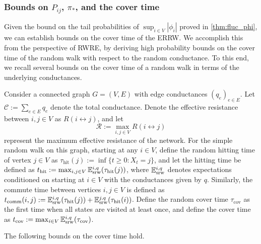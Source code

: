 \documentclass[a4paper, 11pt]{article}
\newcommand{\E}{\mathbb{E}}
\newcommand{\Esrw}{\E_{\textnormal{srw}}}
\begin{document}
\subsubsection{Bounds on $P_{ij}$, $\pi_*$, and the cover time}

Given the bound on the tail probabilities of $\sup_{i\in V}|\phi_i|$ proved in \cref{thm:fluc_phi}, we can establish bounds on the cover time of the ERRW. We accomplish this from the perspective of RWRE, by deriving high probability bounds on the cover time of the random walk with respect to the random conductance. To this end, we recall several bounds on the cover time of a random walk 
in terms of the underlying conductances.

Consider a connected graph \( G = (V, E) \) with edge conductances \( (q_e)_{e \in E} \). Let \( \mathcal{C} := \sum_{e \in E} q_e \) denote the total conductance. Denote the effective resistance between \( i, j \in V \) as \( R(i \leftrightarrow j) \), and let 
\[
\mathcal{R} := \max_{i,j \in V} R(i \leftrightarrow j)
\]
represent the maximum effective resistance of the network. For the simple random walk on this graph, starting at any $i \in V$, define the random hitting time of vertex \( j \in V \) as $\tau_{\text{hit}}(j) := \inf \{ t \geq 0 : X_t = j \}$, and let the hitting time be defined as $t_{\text{hit}} := \max_{i,j \in V} \Esrw^{i,q}(\tau_{\text{hit}}(j))$, where 
$\Esrw^{i,q}$ denotes expectations conditioned on 
starting at $i \in V$ with the conductances given by $q$.
Similarly, the commute time between vertices \( i, j \in V \) is defined as $t_{\text{comm}}(i,j) := \Esrw^{i,q}(\tau_{\text{hit}}(j)) + \Esrw^{j,q}(\tau_{\text{hit}}(i))$. Define the random cover time $\tau_{\text{cov}}$ as the first time when all states are visited at least once, and define the cover time as $t_{\text{cov}} := \max_{i \in V} \Esrw^{i,q}(\tau_{\text{cov}})$.

The following bounds on the cover time hold.
\end{document}
